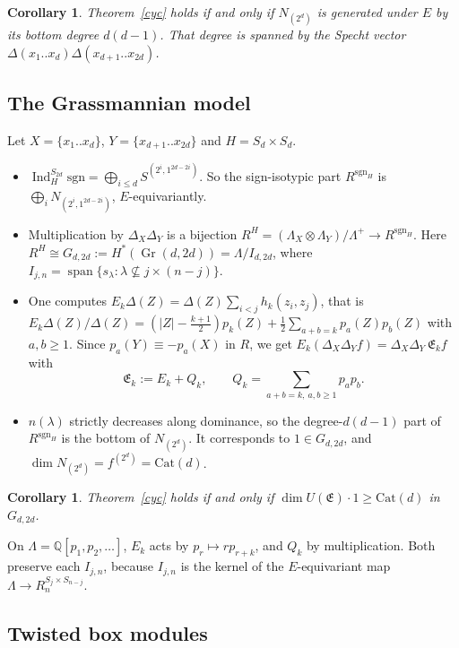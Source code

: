 \documentclass[11pt]{article}
\newtheorem{corollary}[theorem]{Corollary}
\theoremstyle{definition}
\theoremstyle{remark}
\newcommand{\Q}{\mathbb{Q}}
\newcommand{\La}{\Lambda}
\newcommand{\Gr}{\operatorname{Gr}}
\newcommand{\fE}{\mathfrak{E}}
\begin{document}
\begin{corollary}
Theorem~\ref{cyc} holds if and only if $N_{(2^d)}$ is generated under $E$ by its bottom degree $d(d-1)$. That
degree is spanned by the Specht vector $\Delta(x_1..x_d)\Delta(x_{d+1}..x_{2d})$.
\end{corollary}

\subsection{The Grassmannian model}

Let $X=\{x_1..x_d\}$, $Y=\{x_{d+1}..x_{2d}\}$ and $H=S_d\times S_d$.
\begin{itemize}
\item $\operatorname{Ind}_H^{S_{2d}}\mathrm{sgn}=\bigoplus_{i\le d}S^{(2^i,1^{2d-2i})}$. So the sign-isotypic part
$R^{\mathrm{sgn}_H}$ is $\bigoplus_iN_{(2^i,1^{2d-2i})}$, $E$-equivariantly.
\item Multiplication by $\Delta_X\Delta_Y$ is a bijection
$R^H=(\La_X\otimes\La_Y)/\La^+\to R^{\mathrm{sgn}_H}$. Here $R^H\cong G_{d,2d}:=H^*(\Gr(d,2d))=\La/I_{d,2d}$, where
$I_{j,n}=\operatorname{span}\{s_\lambda:\lambda\not\subseteq j\times(n-j)\}$.
\item One computes $E_k\Delta(Z)=\Delta(Z)\sum_{i<j}h_k(z_i,z_j)$, that is
$E_k\Delta(Z)/\Delta(Z)=(|Z|-\tfrac{k+1}2)p_k(Z)+\tfrac12\sum_{a+b=k}p_a(Z)p_b(Z)$ with $a,b\ge1$. Since
$p_a(Y)\equiv-p_a(X)$ in $R$, we get $E_k(\Delta_X\Delta_Yf)=\Delta_X\Delta_Y\,\fE_kf$ with
\[
  \fE_k:=E_k+Q_k,\qquad Q_k=\sum_{a+b=k,\ a,b\ge1}p_ap_b .
\]
\item $n(\lambda)$ strictly decreases along dominance, so the degree-$d(d-1)$ part of $R^{\mathrm{sgn}_H}$ is the
bottom of $N_{(2^d)}$. It corresponds to $1\in G_{d,2d}$, and $\dim N_{(2^d)}=f^{(2^d)}=\mathrm{Cat}(d)$.
\end{itemize}

\begin{corollary}\label{grassred}
Theorem~\ref{cyc} holds if and only if $\dim U(\fE)\cdot1\ge\mathrm{Cat}(d)$ in $G_{d,2d}$.
\end{corollary}

On $\La=\Q[p_1,p_2,\dots]$, $E_k$ acts by $p_r\mapsto rp_{r+k}$, and $Q_k$ by multiplication. Both preserve each
$I_{j,n}$, because $I_{j,n}$ is the kernel of the $E$-equivariant map $\La\to R_n^{S_j\times S_{n-j}}$.

\subsection{Twisted box modules}
\end{document}
